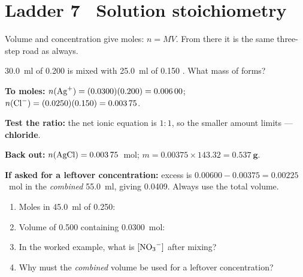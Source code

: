 \documentclass{apchem-worksheet}
\begin{document}
\section*{\sffamily Ladder 7 \textbullet\ Solution stoichiometry}

Volume and concentration give moles: $n = MV$. From there it is the same
three-step road as always.

\begin{workedexample}
\SI{30.0}{\milli\litre} of \SI{0.200}{\Molar}  is mixed with
\SI{25.0}{\milli\litre} of \SI{0.150}{\Molar} . What mass of
 forms?

\textbf{To moles:} $n(\ce{Ag+}) = (0.0300)(0.200) = \num{0.00600}$;
$n(\ce{Cl-}) = (0.0250)(0.150) = \num{0.00375}$.

\textbf{Test the ratio:} the net ionic equation
 is $1:1$, so the smaller amount limits ---
\textbf{chloride}.

\textbf{Back out:} $n(\ce{AgCl}) = \num{0.00375}$~mol;
$m = 0.00375 \times 143.32 = \mathbf{0.537~g}$.

\textbf{If asked for a leftover concentration:} excess  is
$0.00600 - 0.00375 = \num{0.00225}$~mol in the \emph{combined}
\SI{55.0}{\milli\litre}, giving \SI{0.0409}{\Molar}. Always use the total
volume.
\end{workedexample}

\begin{yourturn}
\begin{enumerate}[leftmargin=*,itemsep=0.5em]
  \item Moles in \SI{45.0}{\milli\litre} of \SI{0.250}{\Molar}:
        \workspace[1.4cm]
  \item Volume of \SI{0.500}{\Molar} containing \SI{0.0300}{\mole}:
        \workspace[1.4cm]
  \item In the worked example, what is $[\ce{NO3-}]$ after mixing?
        \workspace[1.8cm]
  \item Why must the \emph{combined} volume be used for a leftover
        concentration? \workspace[1.6cm]
\end{enumerate}
\end{yourturn}
\end{document}
